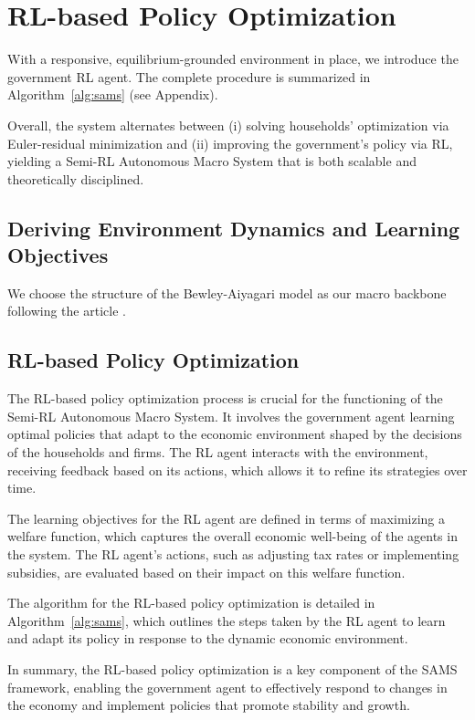 
\section{RL-based Policy Optimization}

With a responsive, equilibrium-grounded environment in place, we introduce the government RL agent. The complete procedure is summarized in Algorithm~\ref{alg:sams} (see Appendix).

Overall, the system alternates between (i) solving households’ optimization via Euler-residual minimization and (ii) improving the government’s policy via RL, yielding a Semi-RL Autonomous Macro System that is both scalable and theoretically disciplined.

\subsection{Deriving Environment Dynamics and Learning Objectives}

We choose the structure of the Bewley-Aiyagari model as our macro backbone following the article \cite{mi2023taxai}.

\subsection{RL-based Policy Optimization}

The RL-based policy optimization process is crucial for the functioning of the Semi-RL Autonomous Macro System. It involves the government agent learning optimal policies that adapt to the economic environment shaped by the decisions of the households and firms. The RL agent interacts with the environment, receiving feedback based on its actions, which allows it to refine its strategies over time.

The learning objectives for the RL agent are defined in terms of maximizing a welfare function, which captures the overall economic well-being of the agents in the system. The RL agent's actions, such as adjusting tax rates or implementing subsidies, are evaluated based on their impact on this welfare function.

The algorithm for the RL-based policy optimization is detailed in Algorithm~\ref{alg:sams}, which outlines the steps taken by the RL agent to learn and adapt its policy in response to the dynamic economic environment.

In summary, the RL-based policy optimization is a key component of the SAMS framework, enabling the government agent to effectively respond to changes in the economy and implement policies that promote stability and growth.